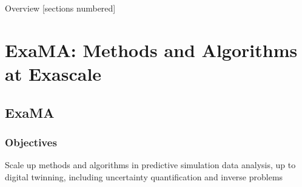 \titleframe

\begin{frame}{Overview}
  [sections numbered]
  \tableofcontents[hideallsubsections]
\end{frame}


\section{ExaMA: Methods and Algorithms at Exascale}

\subsection{ExaMA}

\begin{frame}
  \frametitle{Objectives}

  \begin{center}
    Scale up methods and algorithms in predictive simulation data analysis, up to digital twinning, including uncertainty quantification and inverse problems

  \end{center}
  
\end{frame}

